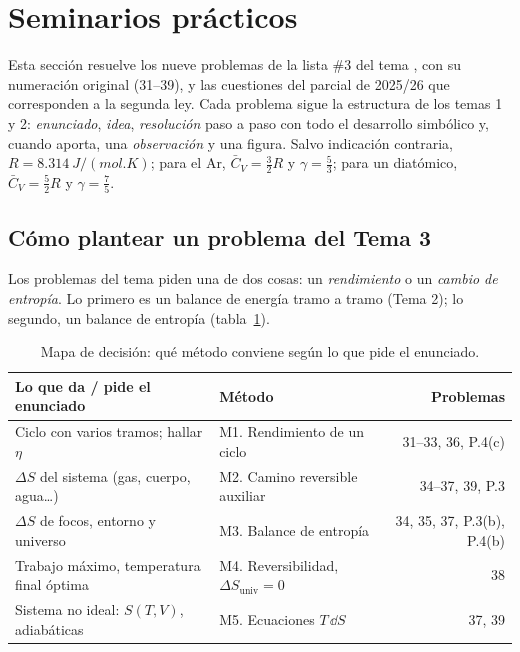 \section{Seminarios prácticos}
Esta sección resuelve los nueve problemas de la lista \#3 del tema \cite{gonzalez1}, con su numeración
original (31--39), y las cuestiones del parcial de 2025/26 \cite{parcial} que corresponden a la segunda ley.
Cada problema sigue la estructura de los temas 1 y 2: \emph{enunciado}, \emph{idea}, \emph{resolución} paso a
paso con todo el desarrollo simbólico y, cuando aporta, una \emph{observación} y una figura. Salvo
indicación contraria, $R=\SI{8,314}{J/(mol.K)}$; para el Ar, $\bar C_V=\tfrac32R$ y $\gamma=\tfrac53$; para un
diatómico, $\bar C_V=\tfrac52R$ y $\gamma=\tfrac75$.

\subsection{Cómo plantear un problema del Tema 3}

Los problemas del tema piden una de dos cosas: un \emph{rendimiento} o un \emph{cambio de entropía}. Lo
primero es un balance de energía tramo a tramo (Tema 2); lo segundo, un balance de entropía
(tabla~\ref{tab:metodos}).

\begin{table}[htbp]
\centering
\caption{Mapa de decisión: qué método conviene según lo que pide el enunciado.}
\label{tab:metodos}
\small
\begin{tabularx}{\textwidth}{Xlr}
\toprule
Lo que da / pide el enunciado & Método & Problemas\\
\midrule
Ciclo con varios tramos; hallar $\eta$ & M1. Rendimiento de un ciclo & 31--33, 36, P.4(c)\\
$\Delta S$ del sistema (gas, cuerpo, agua\dots) & M2. Camino reversible auxiliar & 34--37, 39, P.3\\
$\Delta S$ de focos, entorno y universo & M3. Balance de entropía & 34, 35, 37, P.3(b), P.4(b)\\
Trabajo máximo, temperatura final óptima & M4. Reversibilidad, $\Delta S_{\mathrm{univ}}=0$ & 38\\
Sistema no ideal: $S(T,V)$, adiabáticas & M5. Ecuaciones $T\,\dd S$ & 37, 39\\
\bottomrule
\end{tabularx}
\end{table}

